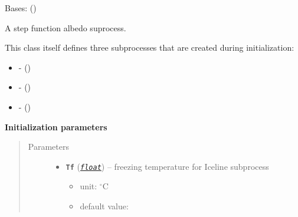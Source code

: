 \documentclass[a4paper,10pt,english]{sphinxmanual}
\begin{document}

\begin{fulllineitems}
\label{api/climlab.surface:climlab.surface.albedo.StepFunctionAlbedo}
Bases: {\hyperref[api/climlab.process:climlab.process.diagnostic.DiagnosticProcess]{\emph{}}} ()

A step function albedo suprocess.

This class itself defines three subprocesses that are created during 
initialization:
\begin{itemize}
\item {} 
 - {\hyperref[api/climlab.surface:climlab.surface.albedo.Iceline]{\emph{}}} ()

\item {} 
 - {\hyperref[api/climlab.surface:climlab.surface.albedo.P2Albedo]{\emph{}}} ()

\item {} 
 - {\hyperref[api/climlab.surface:climlab.surface.albedo.ConstantAlbedo]{\emph{}}} ()

\end{itemize}

\textbf{Initialization parameters}
\begin{quote}\begin{description}
\item[{Parameters}] \leavevmode\begin{itemize}
\item {} 
\textbf{\texttt{Tf}} (\href{http://docs.python.org/2.7/library/functions.html\#float}{\emph{\texttt{float}}}) -- 
freezing temperature for Iceline subprocess
\begin{itemize}
\item {} 
unit: \(^{\circ} \textrm{C}\)

\item {} 
default value: 


\end{itemize}
\end{itemize}
\end{description}
\end{quote}
\end{fulllineitems}
\end{document}
